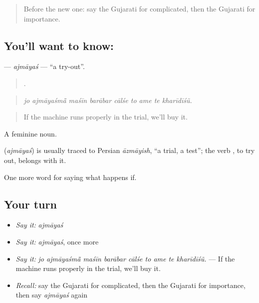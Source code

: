 \label{lesson:GU-C545-ajmayas}



\begin{quote}
Before the new one: say the Gujarati for complicated, then the Gujarati for importance.
\end{quote}

\subsection*{You'll want to know: }
\textbf{} — \emph{ajmāyaś} — \textquotedblleft{}a try-out\textquotedblright{}.

\begin{quote}
        .
\end{quote}

\begin{quote}
\emph{jo ajmāyaśmā̃ maśīn barābar cālśe to ame te kharīdīśũ.}
\end{quote}

\begin{quote}
If the machine runs properly in the trial, we'll buy it.
\end{quote}

A feminine noun.

\begin{cousinweb}
\textbf{} (\emph{ajmāyaś}) is usually traced to Persian \emph{āzmāyish}, \textquotedblleft{}a trial, a test\textquotedblright{}; the verb \textbf{}, to try out, belongs with it.
\end{cousinweb}

\begin{grammarlens}[title={What you've built}]
One more word for saying what happens if.
\end{grammarlens}

\subsection*{Your turn}
\begin{itemize}
\raggedright
  \item \emph{Say it:} \emph{ajmāyaś}
  \item \emph{Say it:} \emph{ajmāyaś}, once more
  \item \emph{Say it:} \emph{jo ajmāyaśmā̃ maśīn barābar cālśe to ame te kharīdīśũ.} — If the machine runs properly in the trial, we'll buy it.
  \item \emph{Recall:} say the Gujarati for complicated, then the Gujarati for importance, then say \emph{ajmāyaś} again
\end{itemize}

